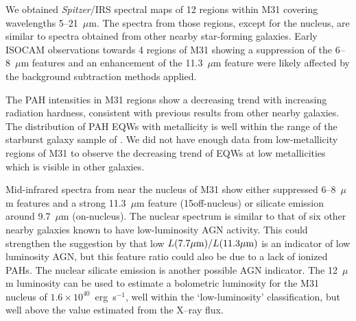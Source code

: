 We  obtained {\em Spitzer}/IRS spectral maps of 12 regions within M31 covering wavelengths 5--21~$\mu$m. 
The spectra from those regions, except for the nucleus, are similar to spectra obtained from other nearby  star-forming galaxies. 
Early  ISOCAM observations  towards 4 regions of M31 showing a suppression 
of the 6--8~$\mu$m features and an enhancement of  the 11.3~$\mu$m feature  \citep{1998Cesarsky} 
were likely affected by the background subtraction methods applied.

The PAH intensities in M31 regions show a decreasing trend with increasing radiation hardness, consistent with previous 
results from other nearby galaxies. The distribution of PAH EQWs with metallicity is well within the range of the starburst galaxy sample of \citet{Engelbracht_2008}. 
We did not have enough data from low-metallicity regions of M31 to observe the decreasing trend of EQWs at low metallicities which is visible in other galaxies.

Mid-infrared spectra from near the nucleus of M31 show either suppressed 6--8~$\mu$m features and a strong 11.3~$\mu$m feature
(15\arcsec off-nucleus) or silicate emission around 9.7~$\mu$m  (on-nucleus). 
The nuclear spectrum is similar to that of six other nearby galaxies known to have low-luminosity AGN activity. This could strengthen the
suggestion by \citet{Smith:2007lr} that low $L(7.7\mu{\rm m})/L(11.3\mu{\rm m})$ is an indicator of low luminosity AGN,
but this feature ratio could also be due to a lack of ionized PAHs. The nuclear silicate emission is another possible AGN indicator.
The 12~$\mu$m luminosity can be used to estimate a bolometric luminosity for the M31 nucleus of $1.6\times 10^{40}$~erg~s$^{-1}$,
well within the `low-luminosity' classification, but well above the value estimated from the X--ray flux.
